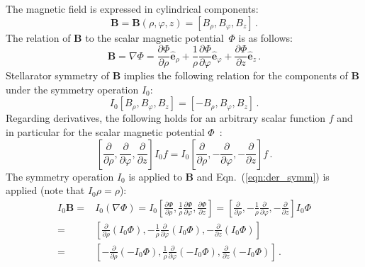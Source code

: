 The magnetic field is expressed in cylindrical components:
\begin{equation}
  \mathbf{B} = \mathbf{B}(\rho, \varphi, z) = \left[ B_\rho, B_\varphi, B_z \right] \, .
\end{equation}
The relation of $\mathbf{B}$ to the scalar magnetic potential~$\Phi$ is as follows:
\begin{equation}
    \mathbf{B} = \nabla \Phi
  =                  \frac{\partial \Phi}{\partial \rho}    \hat{\mathbf{e}}_\rho
    + \frac{1}{\rho} \frac{\partial \Phi}{\partial \varphi} \hat{\mathbf{e}}_\varphi
    +                \frac{\partial \Phi}{\partial z}       \hat{\mathbf{e}}_z \, . \label{eqn:comp_B}
\end{equation}
Stellarator symmetry of $\mathbf{B}$ implies the following relation for the components of $\mathbf{B}$
under the symmetry operation $I_0$:
\begin{equation}
  I_0 \left[ B_\rho, B_\varphi, B_z \right] = \left[ -B_\rho, B_\varphi, B_z \right] \, . \label{eqn:vec_symm}
\end{equation}
Regarding derivatives, the following holds for an arbitrary scalar function $f$ and in particular for the scalar magnetic potential $\Phi$~\cite{dewar_hudson_1998_stellarator_symmetry}:
\begin{equation}
        \left[ \frac{\partial}{\partial \rho},   \frac{\partial}{\partial \varphi},   \frac{\partial}{\partial z} \right] I_0 f
  = I_0 \left[ \frac{\partial}{\partial \rho}, - \frac{\partial}{\partial \varphi}, - \frac{\partial}{\partial z} \right]     f \, . \label{eqn:der_symm}
\end{equation}
The symmetry operation $I_0$ is applied to $\mathbf{B}$ and Eqn.~(\ref{eqn:der_symm}) is applied (note that $I_0 \rho = \rho$):
\begin{align}
    I_0 \mathbf{B}
  =& I_0 \left( \nabla \Phi \right)
  =  I_0 \left[ \frac{\partial \Phi}{\partial \rho}, \frac{1}{\rho} \frac{\partial \Phi}{\partial \varphi}, \frac{\partial \Phi}{\partial z} \right]
  =  \left[ \frac{\partial}{\partial \rho}, - \frac{1}{\rho}\frac{\partial}{\partial \varphi}, - \frac{\partial}{\partial z} \right] I_0 \Phi \nonumber \\
  =& \left[ \frac{\partial}{\partial \rho} \left( I_0 \Phi \right), - \frac{1}{\rho}\frac{\partial}{\partial \varphi} \left( I_0 \Phi \right), - \frac{\partial}{\partial z} \left( I_0 \Phi \right) \right] \nonumber \\
  =& \left[ - \frac{\partial}{\partial \rho} \left(- I_0 \Phi \right), \frac{1}{\rho}\frac{\partial}{\partial \varphi} \left(- I_0 \Phi \right), \frac{\partial}{\partial z} \left(- I_0 \Phi \right) \right] \, .
\end{align}
